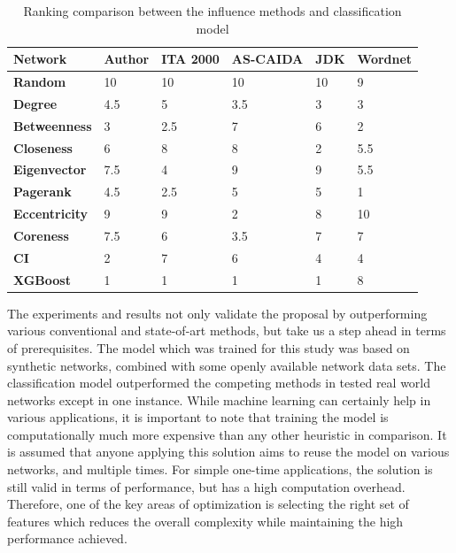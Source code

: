 		\begin{table}[h]
			\centering
			\begin{tabular}{|l|l|l|l|l|l|}
				\hline
				\textbf{Network} & \textbf{Author} & \textbf{ITA 2000} & \textbf{AS-CAIDA} & \textbf{JDK} & \textbf{Wordnet} \\ \hline
				\textbf{Random}       & 10  & 10  & 10  & 10 & 9   \\ \hline
				\textbf{Degree}       & 4.5 & 5   & 3.5 & 3  & 3   \\ \hline
				\textbf{Betweenness}  & 3   & 2.5 & 7   & 6  & 2   \\ \hline
				\textbf{Closeness}    & 6   & 8   & 8   & 2  & 5.5 \\ \hline
				\textbf{Eigenvector}  & 7.5 & 4   & 9   & 9  & 5.5 \\ \hline
				\textbf{Pagerank}     & 4.5 & 2.5 & 5   & 5  & 1   \\ \hline
				\textbf{Eccentricity} & 9   & 9   & 2   & 8  & 10  \\ \hline
				\textbf{Coreness}     & 7.5 & 6   & 3.5 & 7  & 7   \\ \hline
				\textbf{CI}           & 2   & 7   & 6   & 4  & 4   \\ \hline
				\textbf{XGBoost}      & 1   & 1   & 1   & 1  & 8   \\ \hline
			\end{tabular}
			\caption{Ranking comparison between the influence methods and classification model}
			\label{tab:inf-max-machine-learning-ranking}
		\end{table}
		
		The experiments and results not only validate the proposal by outperforming various conventional and state-of-art methods, but take us a step ahead in terms of prerequisites. The model which was trained for this study was based on synthetic networks, combined with some openly available network data sets. The classification model outperformed the competing methods in tested real world networks except in one instance. While machine learning can certainly help in various applications, it is important to note that training the model is computationally much more expensive than any other heuristic in comparison. It is assumed that anyone applying this solution aims to reuse the model on various networks, and multiple times. For simple one-time applications, the solution is still valid in terms of performance, but has a high computation overhead. Therefore, one of the key areas of optimization is selecting the right set of features which reduces the overall complexity while maintaining the high performance achieved.
		
